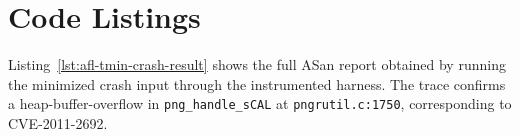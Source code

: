 \documentclass[letterpaper,twocolumn,10pt]{article}
\begin{document}



\section{Code Listings}
\label{app:code}

Listing~\ref{lst:afl-tmin-crash-result} shows the full ASan report obtained by running the minimized crash input through the instrumented harness. The trace confirms a heap-buffer-overflow in \lstinline|png_handle_sCAL| at \lstinline|pngrutil.c:1750|, corresponding to CVE-2011-2692.

\end{document}
